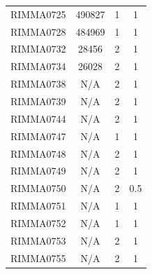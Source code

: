 \documentclass[11pt]{article}
\newcounter{rowno}
\begin{document}
\begin{scriptsize}
\begin{longtable}{>{\stepcounter{rowno}}cccc}
    RIMMA0725 & 490827 & 1     & 1 \\
    RIMMA0728 & 484969 & 1     & 1 \\
    RIMMA0732 & 28456 & 2     & 1 \\
    RIMMA0734 & 26028 & 2     & 1 \\
    RIMMA0738 & N/A & 2     & 1 \\
    RIMMA0739 & N/A & 2     & 1 \\
    RIMMA0744 & N/A & 2     & 1 \\
    RIMMA0747 & N/A & 1     & 1 \\
    RIMMA0748 & N/A & 2     & 1 \\
    RIMMA0749 & N/A & 2     & 1 \\
    RIMMA0750 & N/A & 2     & 0.5 \\
    RIMMA0751 & N/A & 1     & 1 \\
    RIMMA0752 & N/A & 1     & 1 \\
    RIMMA0753 & N/A & 2     & 1 \\
    RIMMA0755 & N/A & 2     & 1 \\
    \hline
\end{longtable}
\end{scriptsize}

\clearpage


\clearpage
\end{document}
